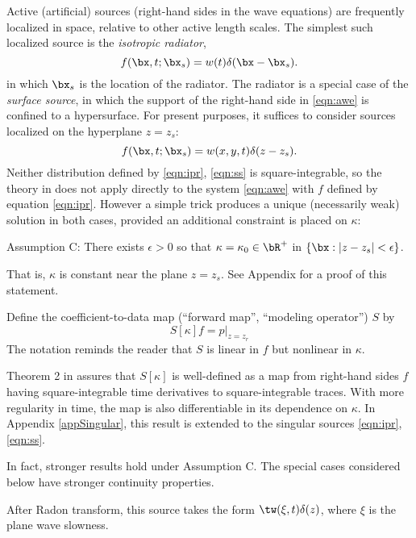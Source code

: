 Active (artificial) sources (right-hand sides in the wave equations)
are frequently localized in space, relative to other active length scales. The
simplest such localized source is the {\em isotropic radiator},
\begin{equation}
  \label{eqn:ipr}
  f(\bx,t;\bx_s) = w(t)\delta(\bx-\bx_s).  
\end{equation} 
in which $\bx_s$ is the location of the radiator. The radiator is a
special case of the {\em surface source}, in which the support of the
right-hand side in \ref{eqn:awe} is confined to a hypersurface. For
present purposes, it suffices to consider sources localized on the
hyperplane $z=z_s$:
\begin{equation}
  \label{eqn:ss}
  f(\bx,t;\bx_s) = w(x,y,t)\delta(z-z_s). 
\end{equation}
Neither distribution defined by \ref{eqn:ipr}, \ref{eqn:ss} is 
square-integrable, so the theory in \cite[]{BlazekStolkSymes:13} does
not apply directly to the system \ref{eqn:awe} with $f$ defined by
equation \ref{eqn:ipr}. However a simple trick produces a unique
(necessarily weak) solution in both cases, provided an additional
constraint is placed on $\kappa$:

\indent Assumption C: There exists $\epsilon >0$ so that $\kappa =
\kappa_0 \in \bR^+$ in $\{\bx: |z-z_s|<\epsilon\}$.

\noindent That is, $\kappa$ is constant near the plane $z=z_s$. See
Appendix \appSingular for a proof of this statement.

Define the coefficient-to-data map (``forward map'', ``modeling
operator'') $S$ by
\begin{equation}
\label{eqn:fwd}
S[\kappa]f = p|_{z=z_r}
\end{equation}
The notation reminds the reader that $S$ is linear in $f$ but
nonlinear in $\kappa$.

Theorem 2 in \cite[]{BlazekStolkSymes:13} assures that $S[\kappa]$ is
well-defined as a map from right-hand sides $f$ having
square-integrable time derivatives to square-integrable traces. With
more regularity in time, the map is also differentiable in its
dependence on $\kappa$. In Appendix \ref{appSingular}, this result is
extended to the singular sources \ref{eqn:ipr}, \ref{eqn:ss}.

In fact, stronger results hold under Assumption C. The special cases
considered below have stronger continuity properties.



After Radon transform, this source takes the form
$\tw(\xi,t)\delta(z)$, where $\xi$ is the plane wave slowness. 

